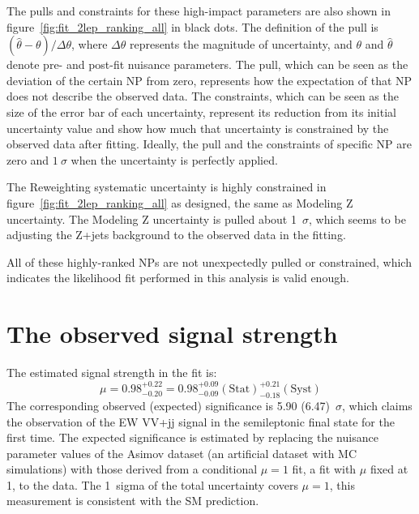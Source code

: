 The pulls and constraints for these high-impact parameters are also shown in figure~\ref{fig:fit_2lep_ranking_all} in black dots.
The definition of the pull is $(\hat{\theta}-\theta) / \Delta \theta$, where $\Delta \theta$ represents the magnitude of uncertainty, and $\theta$ and $\hat{\theta}$ denote pre- and post-fit nuisance parameters.
The pull, which can be seen as the deviation of the certain NP from zero, represents how the expectation of that NP does not describe the observed data.
The constraints, which can be seen as the size of the error bar of each uncertainty, represent its reduction from its initial uncertainty value and show how much that uncertainty is constrained by the observed data after fitting.
Ideally, the pull and the constraints of specific NP are zero and $1~\sigma$ when the uncertainty is perfectly applied.

The Reweighting systematic uncertainty is highly constrained in figure~\ref{fig:fit_2lep_ranking_all} as designed, the same as Modeling Z uncertainty. The Modeling Z uncertainty is pulled about 1~$\sigma$, which seems to be adjusting the Z+jets background to the observed data in the fitting.

All of these highly-ranked NPs are not unexpectedly pulled or constrained, which indicates the likelihood fit performed in this analysis is valid enough.


\section{The observed signal strength}
\label{sec:mu}
The estimated signal strength in the fit is:
\begin{equation}
    \mu = 0.98^{+ 0.22}_{- 0.20} = 0.98^{+ 0.09}_{- 0.09}(\mathrm{Stat})^{+ 0.21}_{- 0.18}(\mathrm{Syst}) 
\end{equation}
The corresponding observed (expected) significance is 5.90 (6.47)~$\sigma$, which claims the observation of the EW VV+jj signal in the semileptonic final state for the first time. 
The expected significance is estimated by replacing the nuisance parameter values of the Asimov dataset (an artificial dataset with MC simulations) with those derived from a conditional $\mu = 1$ fit, a fit with $\mu$ fixed at 1, to the data. 
The 1~sigma of the total uncertainty covers $\mu = 1$, this measurement is consistent with the SM prediction.

